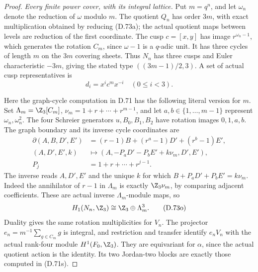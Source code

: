 \begin{proof}
\emph{Every finite power cover, with its integral lattice.}
Put \(m=q^n\), and let \(\omega_n\) denote the reduction
of \(\omega\) modulo \(m\). The quotient \(Q_n\) has
order \(3m\), with exact multiplication obtained by
reducing (D.73a); the actual quotient maps between levels
are reduction of the first coordinate.
The cusp \(c=[x,y]\) has image \(r^{\omega_n-1}\),
which generates the rotation \(C_m\), since
\(\omega-1\) is a \(q\)-adic unit.
It has three cycles of length \(m\) on the \(3m\)
covering sheets. Thus \(N_n\) has three cusps and
Euler characteristic \(-3m\), giving the stated type
\(((3m-1)/2,3)\). A set of actual cusp representatives is
\[
                          d_i=x^i c^m x^{-i}\quad(0\leq i<3).
                                                               \tag{D.73m}
\]

Here the graph-cycle computation in D.71 has the following
literal version for \(m\). Set
\(\Lambda_m=\Z_3[C_m]\), \(\nu_m=1+r+\cdots+r^{m-1}\),
and let \(a,b\in\{1,\ldots,m-1\}\) represent
\(\omega_n,\omega_n^2\). The four Schreier generators
\(u,B_0,B_1,B_2\) have rotation images \(0,1,a,b\).
The graph boundary and its inverse cycle coordinates are
\[
 \begin{aligned}
 \partial(A,B,D',E')&=(r-1)B+(r^a-1)D'+(r^b-1)E',\\
 (A,D',E',k)&\longmapsto
    (A,-P_aD'-P_bE'+k\nu_m,D',E'),\\
 P_j&=1+r+\cdots+r^{j-1}.
 \end{aligned}                                                 \tag{D.73n}
\]
The inverse reads \(A,D',E'\) and the unique \(k\) for
which \(B+P_aD'+P_bE'=k\nu_m\).
Indeed the annihilator of \(r-1\) in \(\Lambda_m\)
is exactly \(\Z_3\nu_m\), by comparing adjacent
coefficients. These are actual inverse
\(\Lambda_m\)-module maps, so
\[
 H_1(N_n,\Z_3)\cong\Z_3\oplus\Lambda_m^3 .
                                                               \tag{D.73o}
\]
Duality gives the same rotation multiplicities for \(V_n\).
The projector \(e_n=m^{-1}\sum_{g\in C_m}g\) is integral,
and restriction and transfer identify \(e_nV_n\) with
the actual rank-four module \(H^1(F_0,\Z_3)\).
They are equivariant for \(\alpha\), since the actual
quotient action is the identity. Its two Jordan-two
blocks are exactly those computed in (D.71s).


\end{proof}
